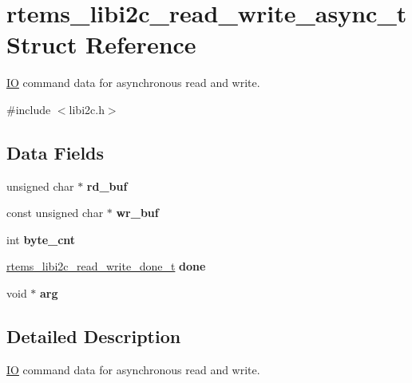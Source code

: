 \hypertarget{structrtems__libi2c__read__write__async__t}{}\section{rtems\+\_\+libi2c\+\_\+read\+\_\+write\+\_\+async\+\_\+t Struct Reference}
\label{structrtems__libi2c__read__write__async__t}


\mbox{\hyperlink{structIO}{IO}} command data for asynchronous read and write.  




{\ttfamily \#include $<$libi2c.\+h$>$}

\subsection*{Data Fields}
\begin{DoxyCompactItemize}
\item 
\mbox{\label{structrtems__libi2c__read__write__async__t_add421a94665a4dc45f8b2d0b27090d65}} 
unsigned char $\ast$ {\bfseries rd\+\_\+buf}
\item 
\mbox{\label{structrtems__libi2c__read__write__async__t_af3538c8a9f3ef176c171b6dedb012038}} 
const unsigned char $\ast$ {\bfseries wr\+\_\+buf}
\item 
\mbox{\label{structrtems__libi2c__read__write__async__t_aff40062d7b35db99663597fca57853e0}} 
int {\bfseries byte\+\_\+cnt}
\item 
\mbox{\label{structrtems__libi2c__read__write__async__t_ad41538fc78252086513315202b763569}} 
\mbox{\hyperlink{group__libi2c_gae9d3e463bdcf351a6d40952c9c57446c}{rtems\+\_\+libi2c\+\_\+read\+\_\+write\+\_\+done\+\_\+t}} {\bfseries done}
\item 
\mbox{\label{structrtems__libi2c__read__write__async__t_a9b9666b34a3ae1231e06167c76ee5cff}} 
void $\ast$ {\bfseries arg}
\end{DoxyCompactItemize}


\subsection{Detailed Description}
\mbox{\hyperlink{structIO}{IO}} command data for asynchronous read and write. 

